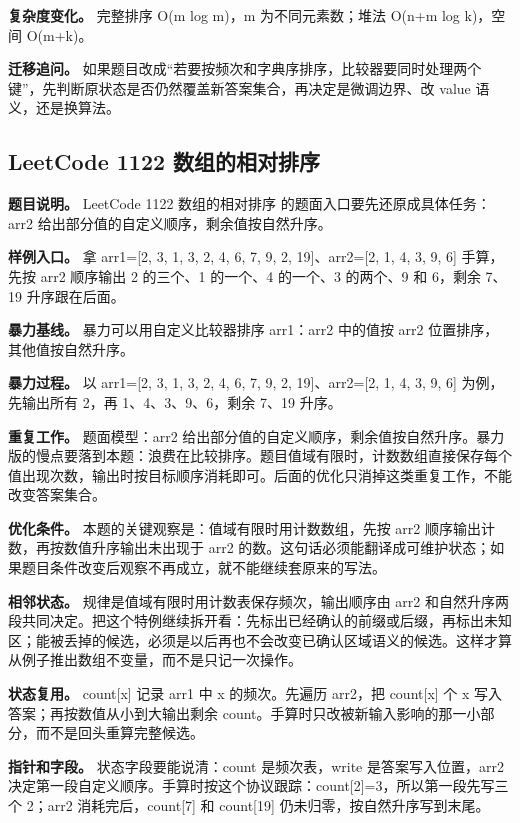 \textbf{复杂度变化。} 完整排序 O(m log m)，m 为不同元素数；堆法 O(n+m log k)，空间 O(m+k)。

\textbf{迁移追问。} 如果题目改成“若要按频次和字典序排序，比较器要同时处理两个键”，先判断原状态是否仍然覆盖新答案集合，再决定是微调边界、改 value 语义，还是换算法。

\subsection{LeetCode 1122 数组的相对排序}

\textbf{题目说明。} LeetCode 1122 数组的相对排序 的题面入口要先还原成具体任务：arr2 给出部分值的自定义顺序，剩余值按自然升序。

\textbf{样例入口。} 拿 arr1=[2, 3, 1, 3, 2, 4, 6, 7, 9, 2, 19]、arr2=[2, 1, 4, 3, 9, 6] 手算，先按 arr2 顺序输出 2 的三个、1 的一个、4 的一个、3 的两个、9 和 6，剩余 7、19 升序跟在后面。

\textbf{暴力基线。} 暴力可以用自定义比较器排序 arr1：arr2 中的值按 arr2 位置排序，其他值按自然升序。

\textbf{暴力过程。} 以 arr1=[2, 3, 1, 3, 2, 4, 6, 7, 9, 2, 19]、arr2=[2, 1, 4, 3, 9, 6] 为例，先输出所有 2，再 1、4、3、9、6，剩余 7、19 升序。

\textbf{重复工作。} 题面模型：arr2 给出部分值的自定义顺序，剩余值按自然升序。暴力版的慢点要落到本题：浪费在比较排序。题目值域有限时，计数数组直接保存每个值出现次数，输出时按目标顺序消耗即可。后面的优化只消掉这类重复工作，不能改变答案集合。

\textbf{优化条件。} 本题的关键观察是：值域有限时用计数数组，先按 arr2 顺序输出计数，再按数值升序输出未出现于 arr2 的数。这句话必须能翻译成可维护状态；如果题目条件改变后观察不再成立，就不能继续套原来的写法。

\textbf{相邻状态。} 规律是值域有限时用计数表保存频次，输出顺序由 arr2 和自然升序两段共同决定。把这个特例继续拆开看：先标出已经确认的前缀或后缀，再标出未知区；能被丢掉的候选，必须是以后再也不会改变已确认区域语义的候选。这样才算从例子推出数组不变量，而不是只记一次操作。

\textbf{状态复用。} count[x] 记录 arr1 中 x 的频次。先遍历 arr2，把 count[x] 个 x 写入答案；再按数值从小到大输出剩余 count。手算时只改被新输入影响的那一小部分，而不是回头重算完整候选。

\textbf{指针和字段。} 状态字段要能说清：count 是频次表，write 是答案写入位置，arr2 决定第一段自定义顺序。手算时按这个协议跟踪：count[2]=3，所以第一段先写三个 2；arr2 消耗完后，count[7] 和 count[19] 仍未归零，按自然升序写到末尾。

